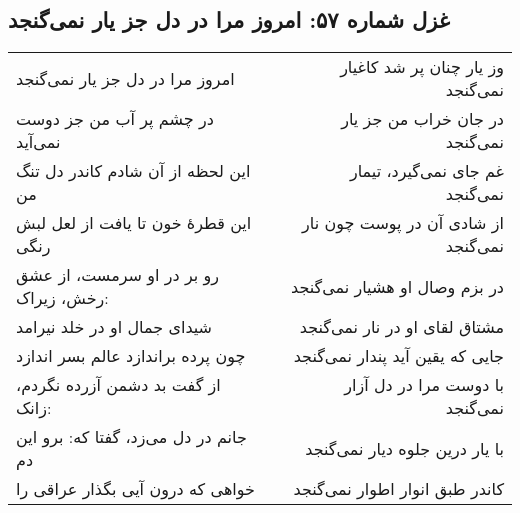 \begin{center}
\section*{غزل شماره ۵۷: امروز مرا در دل جز یار نمی‌گنجد}
\label{sec:057}
\begin{longtable}{l p{0.5cm} r}
امروز مرا در دل جز یار نمی‌گنجد
&&
وز یار چنان پر شد کاغیار نمی‌گنجد
\\
در چشم پر آب من جز دوست نمی‌آید
&&
در جان خراب من جز یار نمی‌گنجد
\\
این لحظه از آن شادم کاندر دل تنگ من
&&
غم جای نمی‌گیرد، تیمار نمی‌گنجد
\\
این قطرهٔ خون تا یافت از لعل لبش رنگی
&&
از شادی آن در پوست چون نار نمی‌گنجد
\\
رو بر در او سرمست، از عشق رخش، زیراک:
&&
در بزم وصال او هشیار نمی‌گنجد
\\
شیدای جمال او در خلد نیرامد
&&
مشتاق لقای او در نار نمی‌گنجد
\\
چون پرده براندازد عالم بسر اندازد
&&
جایی که یقین آید پندار نمی‌گنجد
\\
از گفت بد دشمن آزرده نگردم، زانک:
&&
با دوست مرا در دل آزار نمی‌گنجد
\\
جانم در دل می‌زد، گفتا که: برو این دم
&&
با یار درین جلوه دیار نمی‌گنجد
\\
خواهی که درون آیی بگذار عراقی را
&&
کاندر طبق انوار اطوار نمی‌گنجد
\\
\end{longtable}
\end{center}
